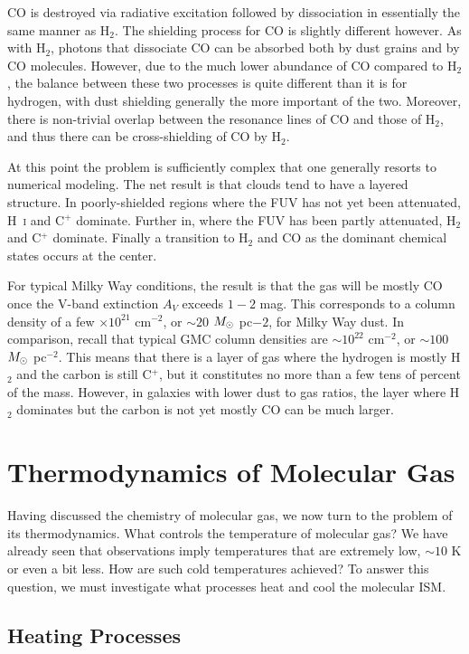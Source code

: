 CO is destroyed via radiative excitation followed by dissociation in essentially the same manner as H$_2$. The shielding process for CO is slightly different however. As with H$_2$, photons that dissociate CO can be absorbed both by dust grains and by CO molecules. However, due to the much lower abundance of CO compared to H$_2$, the balance between these two processes is quite different than it is for hydrogen, with dust shielding generally the more important of the two. Moreover, there is non-trivial overlap between the resonance lines of CO and those of H$_2$, and thus there can be cross-shielding of CO by H$_2$.

At this point the problem is sufficiently complex that one generally resorts to numerical modeling. The net result is that clouds tend to have a layered structure. In poorly-shielded regions where the FUV has not yet been attenuated, H~\textsc{i} and C$^+$ dominate. Further in, where the FUV has been partly attenuated, H$_2$ and C$^+$ dominate. Finally a transition to H$_2$ and CO as the dominant chemical states occurs at the center.

For typical Milky Way conditions, the result is that the gas will be mostly CO once the V-band extinction $A_V$ exceeds $1-2$ mag. This corresponds to a column density of a few $\times 10^{21}$ cm$^{-2}$, or $\sim 20$ $M_{\odot}$ pc${-2}$, for Milky Way dust. In comparison, recall that typical GMC column densities are $\sim 10^{22}$ cm$^{-2}$, or $\sim 100$ $M_{\odot}$ pc$^{-2}$. This means that there is a layer of gas where the hydrogen is mostly H$_2$ and the carbon is still C$^+$, but it constitutes no more than a few tens of percent of the mass. However, in galaxies with lower dust to gas ratios, the layer where H$_2$ dominates but the carbon is not yet mostly CO can be much larger.

\section{Thermodynamics of Molecular Gas}

Having discussed the chemistry of molecular gas, we now turn to the problem of its thermodynamics. What controls the temperature of molecular gas? We have already seen that observations imply temperatures that are extremely low, $\sim 10$ K or even a bit less. How are such cold temperatures achieved? To answer this question, we must investigate what processes heat and cool the molecular ISM.

\subsection{Heating Processes}

